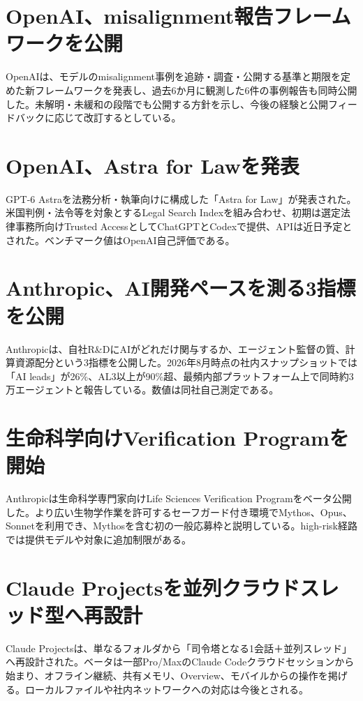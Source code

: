 \section{OpenAI、misalignment報告フレームワークを公開}
OpenAIは、モデルのmisalignment事例を追跡・調査・公開する基準と期限を定めた新フレームワークを発表し、過去6か月に観測した6件の事例報告も同時公開した。未解明・未緩和の段階でも公開する方針を示し、今後の経験と公開フィードバックに応じて改訂するとしている。

\section{OpenAI、Astra for Lawを発表}
GPT-6 Astraを法務分析・執筆向けに構成した「Astra for Law」が発表された。米国判例・法令等を対象とするLegal Search Indexを組み合わせ、初期は選定法律事務所向けTrusted AccessとしてChatGPTとCodexで提供、APIは近日予定とされた。ベンチマーク値はOpenAI自己評価である。

\section{Anthropic、AI開発ペースを測る3指標を公開}
Anthropicは、自社R\&DにAIがどれだけ関与するか、エージェント監督の質、計算資源配分という3指標を公開した。2026年8月時点の社内スナップショットでは「AI leads」が26\%、AL3以上が90\%超、最頻内部プラットフォーム上で同時約3万エージェントと報告している。数値は同社自己測定である。

\section{生命科学向けVerification Programを開始}
Anthropicは生命科学専門家向けLife Sciences Verification Programをベータ公開した。より広い生物学作業を許可するセーフガード付き環境でMythos、Opus、Sonnetを利用でき、Mythosを含む初の一般応募枠と説明している。high-risk経路では提供モデルや対象に追加制限がある。

\section{Claude Projectsを並列クラウドスレッド型へ再設計}
Claude Projectsは、単なるフォルダから「司令塔となる1会話＋並列スレッド」へ再設計された。ベータは一部Pro/MaxのClaude Codeクラウドセッションから始まり、オフライン継続、共有メモリ、Overview、モバイルからの操作を掲げる。ローカルファイルや社内ネットワークへの対応は今後とされる。

